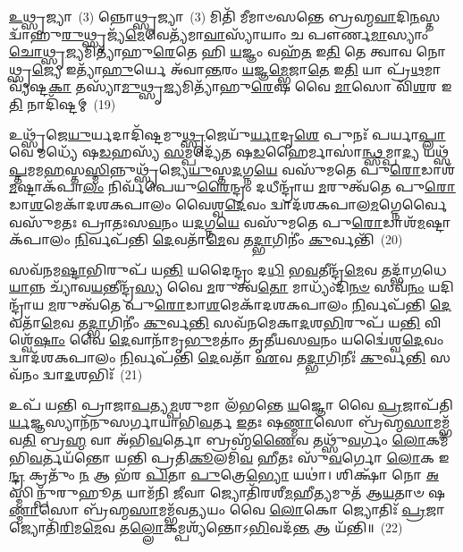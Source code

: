 {%
{\anuvakamend[{\-\ul{𑌉}\-𑌦\-\ul{𑌚}\-𑌤𑍍𑌯𑍁𑌦𑍍𑌯𑍇\-𑌽𑌹᳴\-\ul{𑌰𑌾}\-𑌪𑍍𑌤𑍍𑌵𑌾 𑌪𑌞𑍍𑌚᳴𑌦𑌶 𑌚}]}%

\-\ul{𑌉}\-𑌥𑍍𑌸𑍃𑌜𑍍𑌯𑌾~(3) 𑌨𑍍𑌨𑍋𑌥𑍍𑌸𑍃𑌜𑍍𑌯𑌾~(3) 𑌮𑌿𑌤𑌿᳴ 𑌮𑍀𑌮𑌾𑍞𑌸𑌨𑍍𑌤𑍇 𑌬𑍍𑌰𑌹𑍍𑌮\-\ul{𑌵𑌾}\-𑌦𑌿\-\ul{𑌨}\-𑌸𑍍𑌤𑌦𑍍𑌵𑌾᳴𑌹𑍁\-\ul{𑌰𑍁}\-𑌥𑍍𑌸𑍃𑌜𑍍𑌯᳴\-\ul{𑌮𑍇}\-𑌵𑍇𑌤𑍍𑌯᳴𑌮𑌾\-\ul{𑌵𑌾}\-𑌸𑍍𑌯𑌾᳴𑌯𑌾𑌂 𑌚 𑌪𑍗𑌰𑍍𑌣\-\ul{𑌮𑌾}\-𑌸𑍍𑌯𑌾𑌂 \ul{𑌚𑍋}\-𑌥𑍍𑌸𑍃\-\ul{𑌜𑍍𑌯}\-𑌮𑌿𑌤𑍍𑌯𑌾᳴𑌹𑍁\-\ul{𑌰𑍇}\-𑌤𑍇 𑌹𑌿 \ul{𑌯}\-𑌜𑍍𑌞𑌂 𑌵𑌹᳴\-\ul{𑌤} 𑌇\-\ul{𑌤𑌿} 𑌤𑍇 𑌤𑍍𑌵𑌾𑌵 𑌨𑍋𑌥𑍍𑌸𑍃\-\ul{𑌜𑍍𑌯𑍇} 𑌇𑌤𑍍𑌯𑌾᳴\-\ul{𑌹𑍁}\-𑌰𑍍𑌯𑍇 𑌅᳴𑌵𑌾\-\ul{𑌨𑍍𑌤}\-𑌰𑌂 \ul{𑌯}\-𑌜𑍍𑌞\-\ul{𑌮𑍍𑌭𑍇}\-𑌜𑌾\-\ul{𑌤𑍇} 𑌇\-\ul{𑌤𑌿} 𑌯𑌾 𑌪𑍍𑌰᳴\-\ul{𑌥}\-𑌮𑌾 𑌵𑍍𑌯᳴𑌷𑍍𑌟\-\ul{𑌕𑌾} 𑌤𑌸𑍍𑌯𑌾᳴\-\ul{𑌮𑍁}\-𑌥𑍍𑌸𑍃\-\ul{𑌜𑍍𑌯}\-𑌮𑌿𑌤𑍍𑌯𑌾᳴𑌹𑍁\-\ul{𑌰𑍇}\-𑌷 𑌵𑍈 \ul{𑌮𑌾}\-𑌸𑍋 𑌵𑌿᳴\-\ul{𑌶}\-𑌰 𑌇\-\ul{𑌤𑌿} 𑌨𑌾𑌦𑌿᳴𑌷𑍍𑌟𑌮𑍍~(19)

𑌉𑌥𑍍𑌸𑍃᳴𑌜𑍇\-\ul{𑌯𑍁}\-𑌰𑍍𑌯𑌦𑌾𑌦𑌿᳴𑌷𑍍𑌟𑌮𑍁\-\ul{𑌥𑍍𑌸𑍃}\-𑌜𑍇𑌯𑍁᳴\-\ul{𑌰𑍍𑌯𑌾}\-𑌦𑍃\-\ul{𑌶𑍇} 𑌪𑍁𑌨𑌃᳴ 𑌪𑌰𑍍𑌯𑌾\-\ul{𑌪𑍍𑌲𑌾}\-𑌵𑍇 𑌮𑌧𑍍𑌯𑍇᳴ 𑌷\-\ul{𑌡}\-𑌹𑌸𑍍𑌯᳴ \ul{𑌸}\-𑌮𑍍𑌪𑌦𑍍𑌯𑍇᳴𑌤 𑌷\-\ul{𑌡}\-𑌹𑍈𑌰𑍍𑌮𑌾𑌸𑌾॑\-\ul{𑌨𑍍𑌥𑍍𑌸}\-𑌮𑍍𑌪𑌾\-\ul{𑌦𑍍𑌯} 𑌯𑌥𑍍𑌸᳴\-\ul{𑌪𑍍𑌤}\-𑌮𑌮\-\ul{𑌹}\-\-𑌸𑍍𑌤\-\ul{𑌸𑍍𑌮𑌿}\-𑌨𑍍𑌨𑍁𑌥𑍍𑌸𑍃᳴𑌜𑍍𑌯𑍇\-\ul{𑌯𑍁}\-𑌸𑍍𑌤\-\ul{𑌦}\-𑌗𑍍𑌨\-\ul{𑌯𑍇} 𑌵𑌸𑍁᳴𑌮𑌤𑍇 𑌪𑍁\-\ul{𑌰𑍋}\-𑌡𑌾𑌶᳴\-\-\ul{𑌮}\-𑌷𑍍𑌟𑌾\-𑌕᳴𑌪𑌾\-\ul{𑌲𑌂} 𑌨𑌿𑌰𑍍𑌵᳴𑌪𑍇𑌯𑍁\-\ul{𑌰𑍈}\-𑌨𑍍𑌦𑍍𑌰𑌂 𑌦𑌧𑍀𑌨𑍍𑌦𑍍𑌰𑌾᳴𑌯 \ul{𑌮}\-𑌰𑍁𑌤𑍍𑌵᳴𑌤𑍇 𑌪𑍁\-\ul{𑌰𑍋}\-𑌡𑌾\-\ul{𑌶}\-𑌮𑍇𑌕𑌾᳴\-𑌦𑌶\-𑌕𑌪𑌾𑌲𑌂 𑌵𑍈𑌶𑍍𑌵\-\ul{𑌦𑍇}\-𑌵𑌂 𑌦𑍍𑌵𑌾𑌦᳴𑌶\-𑌕𑌪𑌾𑌲\-\ul{𑌮}\-𑌗𑍍𑌨𑍇𑌰𑍍𑌵𑍈 𑌵𑌸𑍁᳴𑌮𑌤𑌃 𑌪𑍍𑌰𑌾𑌤𑌃𑌸\-\ul{𑌵}\-𑌨𑌂 𑌯\-\ul{𑌦}\-𑌗𑍍𑌨\-\ul{𑌯𑍇} 𑌵𑌸𑍁᳴𑌮𑌤𑍇 𑌪𑍁\-\ul{𑌰𑍋}\-𑌡𑌾𑌶᳴\-\-\ul{𑌮}\-𑌷𑍍𑌟𑌾𑌕᳴𑌪𑌾𑌲𑌂 \ul{𑌨𑌿}\-𑌰𑍍𑌵𑌪᳴𑌨𑍍𑌤𑌿 \ul{𑌦𑍇}\-𑌵𑌤𑌾᳴\-\ul{𑌮𑍇}\-𑌵 𑌤\-\ul{𑌦𑍍𑌭𑌾}\-𑌗𑌿𑌨𑍀𑌂॑ \ul{𑌕𑍁}\-𑌰𑍍𑌵𑌨𑍍𑌤𑌿᳴~(20)

𑌸𑌵᳴𑌨𑌮\-\ul{𑌷𑍍𑌟𑌾}\-𑌭𑌿𑌰𑍁𑌪᳴ 𑌯\-\ul{𑌨𑍍𑌤𑌿} 𑌯𑌦𑍈𑌨𑍍𑌦𑍍𑌰𑌂 𑌦\-\ul{𑌧𑌿} 𑌭\-\ul{𑌵}\-𑌤𑍀𑌨𑍍𑌦𑍍𑌰᳴\-\ul{𑌮𑍇}\-𑌵 𑌤𑌦𑍍𑌭𑌾᳴\-\ul{𑌗}\-𑌧𑍇\-\ul{𑌯𑌾}\-𑌨𑍍𑌨 𑌚𑍍𑌯𑌾᳴𑌵\-\ul{𑌯}\-𑌨𑍍𑌤𑍀𑌨𑍍𑌦𑍍𑌰᳴\-\ul{𑌸𑍍𑌯} 𑌵𑍈 \ul{𑌮}\-𑌰𑍁𑌤𑍍𑌵᳴\-\ul{𑌤𑍋} 𑌮𑌾𑌧𑍍𑌯𑌂᳴𑌦𑌿\-\ul{𑌨}\-\-\ul{𑍞} 𑌸𑌵᳴\-\ul{𑌨𑌂} 𑌯𑌦𑌿𑌨𑍍𑌦𑍍𑌰𑌾᳴𑌯 \ul{𑌮}\-𑌰𑍁𑌤𑍍𑌵᳴𑌤𑍇 𑌪𑍁\-\ul{𑌰𑍋}\-𑌡𑌾\-\ul{𑌶}\-𑌮𑍇𑌕𑌾᳴\-𑌦𑌶\-𑌕𑌪𑌾𑌲𑌂 \ul{𑌨𑌿}\-𑌰𑍍𑌵𑌪᳴𑌨𑍍𑌤𑌿 \ul{𑌦𑍇}\-𑌵𑌤𑌾᳴\-\ul{𑌮𑍇}\-𑌵 𑌤\-\ul{𑌦𑍍𑌭𑌾}\-𑌗𑌿𑌨𑍀𑌂॑ \ul{𑌕𑍁}\-𑌰𑍍𑌵\-\ul{𑌨𑍍𑌤𑌿} 𑌸𑌵᳴𑌨𑌮𑍇𑌕𑌾\-\ul{𑌦}\-𑌶\-\ul{𑌭𑌿}\-𑌰𑍁𑌪᳴ 𑌯\-\ul{𑌨𑍍𑌤𑌿} 𑌵𑌿𑌶𑍍𑌵𑍇᳴\-\ul{𑌷𑌾𑌂} 𑌵𑍈 \ul{𑌦𑍇}\-𑌵𑌾𑌨𑌾᳴𑌮𑍃\-\ul{𑌭𑍁}\-𑌮𑌤𑌾𑌂॑ 𑌤𑍃𑌤𑍀𑌯𑌸\-\ul{𑌵}\-𑌨𑌂 𑌯𑌦𑍍𑌵𑍈॑𑌶𑍍𑌵\-\ul{𑌦𑍇}\-𑌵𑌂 𑌦𑍍𑌵𑌾𑌦᳴𑌶\-𑌕𑌪𑌾𑌲𑌂 \ul{𑌨𑌿}\-𑌰𑍍𑌵𑌪᳴𑌨𑍍𑌤𑌿 \ul{𑌦𑍇}\-𑌵𑌤𑌾᳴ \ul{𑌏}\-𑌵 𑌤\-\ul{𑌦𑍍𑌭𑌾}\-𑌗𑌿𑌨𑍀𑌃॑ \ul{𑌕𑍁}\-𑌰𑍍𑌵\-\ul{𑌨𑍍𑌤𑌿} 𑌸𑌵᳴𑌨𑌂 𑌦𑍍𑌵𑌾\-\ul{𑌦}\-𑌶𑌭𑌿𑌃᳴~(21)

𑌉𑌪᳴ 𑌯𑌨𑍍𑌤𑌿 𑌪𑍍𑌰𑌾𑌜𑌾\-\ul{𑌪}\-𑌤𑍍𑌯\-\ul{𑌮𑍍𑌪}\-𑌶𑍁𑌮𑌾 𑌲᳴𑌭𑌨𑍍𑌤𑍇 \ul{𑌯}\-𑌜𑍍𑌞𑍋 𑌵𑍈 \ul{𑌪𑍍𑌰}\-𑌜𑌾𑌪᳴𑌤𑌿\-\ul{𑌰𑍍𑌯}\-𑌜𑍍𑌞𑌸𑍍𑌯𑌾𑌨᳴𑌨𑍁𑌸𑌰𑍍𑌗𑌾𑌯𑌾𑌭𑌿\-\ul{𑌵}\-𑌰𑍍𑌤 \ul{𑌇}\-𑌤𑌃 𑌷\-\ul{𑌣𑍍𑌮𑌾}\-𑌸𑍋 𑌬𑍍𑌰᳴𑌹𑍍𑌮\-\ul{𑌸𑌾}\-𑌮𑌮𑍍𑌭᳴𑌵\-\ul{𑌤𑌿} 𑌬𑍍𑌰\-\ul{𑌹𑍍𑌮} 𑌵𑌾 𑌅᳴𑌭𑌿\-\ul{𑌵}\-𑌰𑍍𑌤𑍋 𑌬𑍍𑌰𑌹𑍍𑌮᳴\-\ul{𑌣𑍈}\-𑌵 𑌤𑌥𑍍𑌸𑍁᳴\-\ul{𑌵}\-𑌰𑍍𑌗𑌂 \ul{𑌲𑍋}\-𑌕𑌮᳴𑌭𑌿\-\ul{𑌵}\-𑌰𑍍𑌤𑌯᳴𑌨𑍍𑌤𑍋 𑌯𑌨𑍍𑌤𑌿 𑌪𑍍𑌰𑌤𑌿\-\ul{𑌕𑍂}\-𑌲𑌮𑌿᳴\-\ul{𑌵} 𑌹𑍀𑌤𑌃 𑌸𑍁᳴\-\ul{𑌵}\-𑌰𑍍𑌗𑍋 \ul{𑌲𑍋}\-𑌕 𑌇\-\ul{𑌨𑍍𑌦𑍍𑌰} 𑌕𑍍𑌰𑌤𑍁𑌂᳴ \ul{𑌨} 𑌆 𑌭᳴𑌰 \ul{𑌪𑌿}\-𑌤𑌾 \ul{𑌪𑍁}\-𑌤𑍍𑌰𑍇\-\ul{𑌭𑍍𑌯𑍋} 𑌯𑌥𑌾॑। 𑌶𑌿𑌕𑍍𑌷𑌾᳴ 𑌨𑍋 \ul{𑌅}\-𑌸𑍍𑌮𑌿𑌨𑍍𑌪𑍁᳴𑌰𑍁𑌹𑍂\-\ul{𑌤} 𑌯𑌾𑌮᳴𑌨𑌿 \ul{𑌜𑍀}\-𑌵𑌾 𑌜𑍍𑌯𑍋𑌤𑌿᳴𑌰𑌶𑍀\-\ul{𑌮}\-𑌹𑍀\-\ul{𑌤𑍍𑌯}\-𑌮𑍁𑌤᳴ 𑌆\-\ul{𑌯}\-𑌤𑌾𑍞 𑌷\-\ul{𑌣𑍍𑌮𑌾}\-𑌸𑍋 𑌬𑍍𑌰᳴𑌹𑍍𑌮\-\ul{𑌸𑌾}\-𑌮𑌮𑍍𑌭᳴𑌵\-\ul{𑌤𑍍𑌯}\-𑌯𑌂 𑌵𑍈 \ul{𑌲𑍋}\-𑌕𑍋 𑌜𑍍𑌯𑍋𑌤𑌿𑌃᳴ \ul{𑌪𑍍𑌰}\-𑌜𑌾 𑌜𑍍𑌯𑍋𑌤𑌿᳴\-\ul{𑌰𑌿}\-𑌮\-\ul{𑌮𑍇}\-𑌵 𑌤\-\ul{𑌲𑍍𑌲𑍋}\-𑌕𑌮𑍍𑌪𑌶𑍍𑌯᳴𑌨𑍍𑌤𑍋\-𑌽\-\ul{𑌭𑌿}\-𑌵𑌦᳴\-\ul{𑌨𑍍𑌤} 𑌆 𑌯᳴𑌨𑍍𑌤𑌿॥~(22)

}
